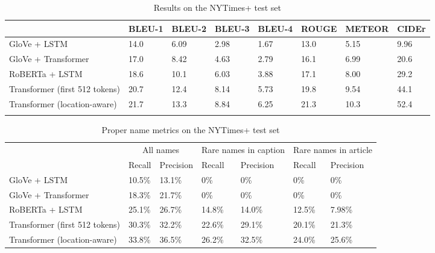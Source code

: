 \documentclass[10pt,twocolumn,letterpaper]{article}
\begin{document}
\begin{table}[t]
	\caption {Results on the NYTimes+ test set}
	\label{tab:results-nytimes}
	\centering
	\begin{tabular}{llllllll}
		\toprule
		  & BLEU-1  & BLEU-2 & BLEU-3 & BLEU-4 & ROUGE & METEOR & CIDEr \\
      \midrule
      GloVe + LSTM & 14.0 & 6.09 & 2.98 & 1.67 & 13.0 & 5.15 & 9.96 \\
      GloVe + Transformer & 17.0 & 8.42 & 4.63 & 2.79 & 16.1 & 6.99 & 20.6 \\ %
      RoBERTa + LSTM & 18.6 & 10.1 & 6.03 & 3.88 & 17.1 & 8.00 & 29.2 \\
      Transformer (first 512 tokens) & 20.7 & 12.4 & 8.14 & 5.73 & 19.8 & 9.54 & 44.1 \\ %
      Transformer (location-aware) & 21.7 & 13.3 & 8.84 & 6.25 & 21.3 & 10.3 & 52.4 \\ %
      \\
		\bottomrule
	\end{tabular}
\end{table}

\begin{table}[t]
	\caption {Proper name metrics on the NYTimes+ test set}
	\label{tab:results-names}
	\centering
	\begin{tabular}{lllllll}
		\toprule
        & \multicolumn{2}{c}{All names} & \multicolumn{2}{c}{Rare names in caption } & \multicolumn{2}{c}{Rare names in article } \\
        & Recall  & Precision & Recall  & Precision & Recall  & Precision \\
      \midrule
      GloVe + LSTM & 10.5\% & 13.1\% & 0\% & 0\% & 0\% & 0\%  \\
      GloVe + Transformer & 18.3\% & 21.7\% & 0\% & 0\% & 0\% & 0\%  \\
      RoBERTa + LSTM & 25.1\% & 26.7\% & 14.8\% & 14.0\% & 12.5\% & 7.98\%  \\
      Transformer (first 512 tokens) & 30.3\% & 32.2\% & 22.6\% & 29.1\% & 20.1\% & 21.3\%  \\
      Transformer (location-aware) & 33.8\% & 36.5\% & 26.2\% & 32.5\% & 24.0\% & 25.6\%   \\
		\bottomrule
	\end{tabular}
\end{table}
\end{document}
